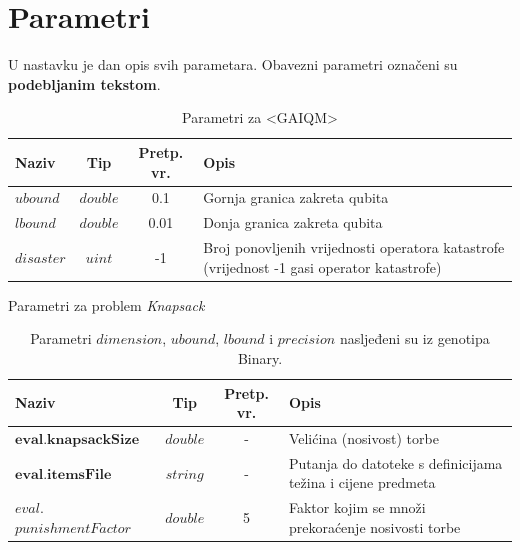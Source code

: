 \documentclass[times, utf8, zavrsni, numeric]{fer}
\begin{document}



\appendix
\chapter{Parametri} 
\label{ch:parametri}
U nastavku je dan opis svih parametara. Obavezni parametri označeni su \textbf{podebljanim tekstom}.

\begin{table}[htb]
\caption{Parametri za <GAIQM>}
\label{tbl:param_gaiqm}
\centering
\begin{tabular}{p{2cm}ccp{8cm}} \hline
Naziv & Tip & Pretp. vr. & Opis\\ \toprule
$ubound$ & $double$ & 0.1 & Gornja granica zakreta qubita \\
$lbound$ & $double$ & 0.01 & Donja granica zakreta qubita \\
$disaster$ & $uint$ & -1 & Broj ponovljenih vrijednosti operatora katastrofe (vrijednost -1 gasi operator katastrofe) \\ \bottomrule
\end{tabular}
\end{table}

\begin{table}[htb]
\caption{Parametri za problem \it Knapsack\rm}
\label{tbl:param_knapsack}
\centering
\caption*{\footnotesize Parametri $dimension$, $ubound$, $lbound$ i $precision$ nasljeđeni su iz genotipa Binary.}
\begin{tabular}{p{4cm}ccp{6cm}} \hline
Naziv & Tip & Pretp. vr. & Opis\\ \toprule
$\textbf{eval.knapsackSize}$ & $double$ & - & Velićina (nosivost) torbe \\
$\textbf{eval.itemsFile}$ & $string$ & - & Putanja do datoteke s definicijama težina i cijene predmeta \\
$eval.$ $punishmentFactor$ & $double$ & 5 & Faktor kojim se množi prekoraćenje nosivosti torbe \\ \bottomrule
\end{tabular}
\end{table}
\end{document}
